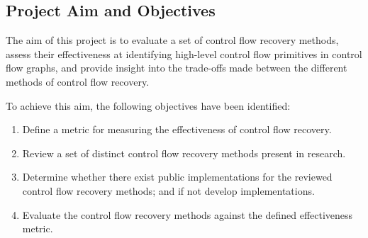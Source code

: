 
\subsection{Project Aim and Objectives}

The aim of this project is to evaluate a set of control flow recovery methods, assess their effectiveness at identifying high-level control flow primitives in control flow graphs, and provide insight into the trade-offs made between the different methods of control flow recovery.

To achieve this aim, the following objectives have been identified:

\begin{enumerate}
	\item \label{itm:obj_define_effectiveness_metric} Define a metric for measuring the effectiveness of control flow recovery.
	\item \label{itm:obj_review_cfa_methods} Review a set of distinct control flow recovery methods present in research.
	\item \label{itm:obj_cfa_components} Determine whether there exist public implementations for the reviewed control flow recovery methods; and if not develop implementations.
	\item \label{itm:obj_cfa_evaluation} Evaluate the control flow recovery methods against the defined effectiveness metric.
\end{enumerate}
